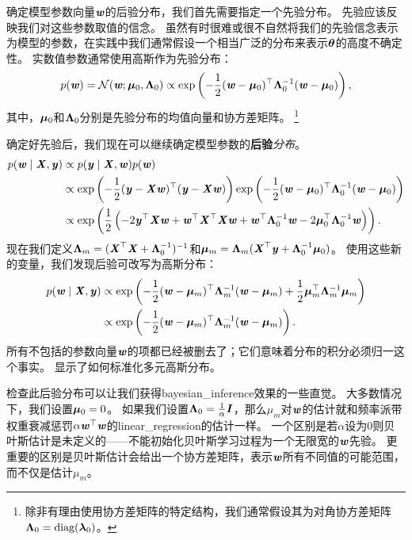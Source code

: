 
确定模型参数向量$\Vw$的后验分布，我们首先需要指定一个先验分布。
先验应该反映我们对这些参数取值的信念。
虽然有时很难或很不自然将我们的先验信念表示为模型的参数，在实践中我们通常假设一个相当广泛的分布来表示$\Vtheta$的高度不确定性。
实数值参数通常使用高斯作为先验分布：
\begin{equation}
    p(\Vw) = \mathcal{N}( \Vw; \Vmu_0, \VLambda_0 ) 
    \propto \exp\left( 
    -\frac{1}{2}( \Vw-\Vmu_0 )^\Tsp \VLambda_0^{-1} ( \Vw-\Vmu_0 )
    \right),
\end{equation}
其中，$\Vmu_0$和$\VLambda_0$分别是先验分布的均值向量和协方差矩阵。
\footnote{除非有理由使用协方差矩阵的特定结构，我们通常假设其为对角协方差矩阵
$\VLambda_0=\text{diag}(\Vlambda_0)$。
}

确定好先验后，我们现在可以继续确定模型参数的\textbf{后验}\emph{分布}。
\begin{align}
    p(\Vw \mid \MX, \Vy) &\propto p(\Vy \mid \MX, \Vw) p(\Vw) \\
    & \propto 
        \exp\left( 
            -\frac{1}{2} ( \Vy - \MX\Vw )^\Tsp( \Vy - \MX\Vw )
        \right)
        \exp\left(
    -\frac{1}{2} ( \Vw - \Vmu_0)^\Tsp \VLambda_0^{-1} ( \Vw - \Vmu_0)
        \right) \\
    & \propto \exp
    \left(
    \frac{1}{2}\left(
    -2\Vy^\Tsp\MX\Vw + \Vw^\Tsp\MX^\Tsp\MX\Vw + \Vw^\Tsp\VLambda_0^{-1}\Vw - 
    2\Vmu_0^\Tsp \VLambda_0^{-1}\Vw
    \right)
    \right).
\end{align}
现在我们定义$\VLambda_m = (\MX^\Tsp\MX + \VLambda_0^{-1})^{-1}$和$\Vmu_m = \VLambda_m ( \MX^\Tsp \Vy + \VLambda_0^{-1}\Vmu_0 )$。
使用这些新的变量，我们发现后验可改写为高斯分布：
\begin{align}
    p(\Vw \mid \MX, \Vy) &\propto \exp \left(
    -\frac{1}{2} (\Vw - \Vmu_m )^\Tsp \VLambda_m^{-1}  (\Vw - \Vmu_m ) 
    + \frac{1}{2} \Vmu_m^\Tsp \VLambda_m^{-1}  \Vmu_m 
    \right) \\
    &\propto \exp\left(
    -\frac{1}{2} (\Vw - \Vmu_m)^\Tsp \VLambda_m^{-1} (\Vw - \Vmu_m)
    \right).
\end{align}
所有不包括的参数向量$\Vw$的项都已经被删去了；它们意味着分布的积分必须归一这个事实。
显示了如何标准化多元高斯分布。


检查此后验分布可以让我们获得\gls{bayesian_inference}效果的一些直觉。
大多数情况下，我们设置$\Vmu_0 = 0$。
如果我们设置$\VLambda_0 = \frac{1}{\alpha}\MI$，那么$\mu_m$对$\Vw$的估计就和频率派带权重衰减惩罚$\alpha\Vw^\Tsp\Vw$的\gls{linear_regression}的估计一样。
一个区别是若$\alpha$设为$0$则贝叶斯估计是未定义的——不能初始化贝叶斯学习过程为一个无限宽的$\Vw$先验。
更重要的区别是贝叶斯估计会给出一个协方差矩阵，表示$\Vw$所有不同值的可能范围，而不仅是估计$\mu_m$。

